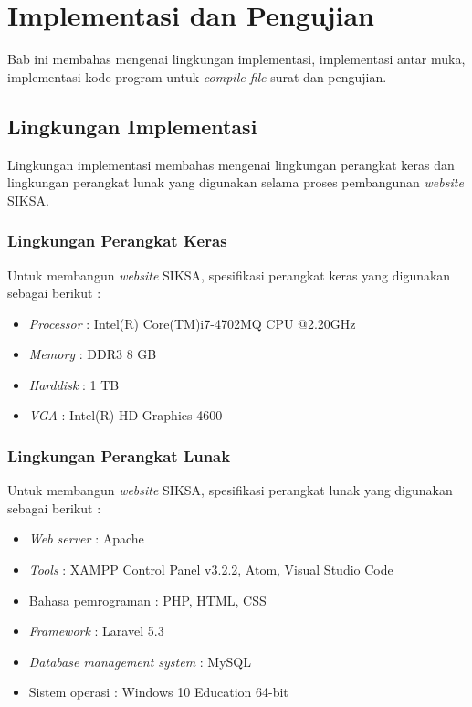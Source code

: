 \chapter{Implementasi dan Pengujian}
\label{chap:implementasi_dan_pengujian}
Bab ini membahas mengenai lingkungan implementasi, implementasi antar muka, implementasi kode program untuk \textit{compile file} surat dan pengujian.
\section{Lingkungan Implementasi}
\label{sec:lingkungan_implementasi}
Lingkungan implementasi membahas mengenai lingkungan perangkat keras dan lingkungan perangkat lunak yang digunakan selama proses pembangunan \textit{website} SIKSA.
\subsection{Lingkungan Perangkat Keras}
\label{sec:lingkungan_perangkat_keras}
Untuk membangun \textit{website} SIKSA, spesifikasi perangkat keras yang digunakan sebagai berikut :
\begin{itemize}
	\item \textit{Processor} : Intel(R) Core(TM)i7-4702MQ CPU @2.20GHz
	\item \textit{Memory} : DDR3 8 GB
	\item \textit{Harddisk} : 1 TB
	\item \textit{VGA} : Intel(R) HD Graphics 4600
\end{itemize}

\subsection{Lingkungan Perangkat Lunak}
\label{sec:lingkungan_perangkat_lunak}
Untuk membangun \textit{website} SIKSA, spesifikasi perangkat lunak yang digunakan sebagai berikut :
\begin{itemize}
	\item \textit{Web server} : Apache
	\item \textit{Tools} : XAMPP Control Panel v3.2.2, Atom, Visual Studio Code
	\item Bahasa pemrograman : PHP, HTML, CSS
	\item \textit{Framework} : Laravel 5.3
	\item \textit{Database management system} : MySQL 
	\item Sistem operasi : Windows 10 Education 64-bit
\end{itemize}

